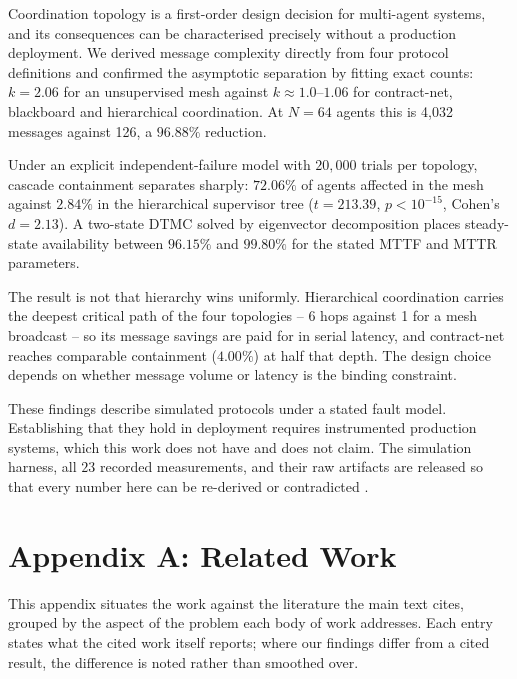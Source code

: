 \documentclass{article}
\begin{document}
Coordination topology is a first-order design decision for multi-agent systems, and its consequences can be characterised precisely without a production deployment. We derived message complexity directly from four protocol definitions and confirmed the asymptotic separation by fitting exact counts: $k = 2.06$ for an unsupervised mesh against $k \approx 1.0$--$1.06$ for contract-net, blackboard and hierarchical coordination. At $N = 64$ agents this is 4{,}032 messages against 126, a $96.88\%$ reduction.

Under an explicit independent-failure model with $20{,}000$ trials per topology, cascade containment separates sharply: $72.06\%$ of agents affected in the mesh against $2.84\%$ in the hierarchical supervisor tree ($t = 213.39$, $p < 10^{-15}$, Cohen's $d = 2.13$). A two-state DTMC solved by eigenvector decomposition places steady-state availability between $96.15\%$ and $99.80\%$ for the stated MTTF and MTTR parameters.

The result is not that hierarchy wins uniformly. Hierarchical coordination carries the deepest critical path of the four topologies -- 6 hops against 1 for a mesh broadcast -- so its message savings are paid for in serial latency, and contract-net reaches comparable containment ($4.00\%$) at half that depth. The design choice depends on whether message volume or latency is the binding constraint.

These findings describe simulated protocols under a stated fault model. Establishing that they hold in deployment requires instrumented production systems, which this work does not have and does not claim. The simulation harness, all $23$ recorded measurements, and their raw artifacts are released so that every number here can be re-derived or contradicted \cite{arxiv_2406_00584,crossref_10_1201_9788743808145_14,crossref_10_1108_jeim_12_2025_1269}.





\section{Appendix A: Related Work}


This appendix situates the work against the literature the main text cites, grouped by the aspect of the problem each body of work addresses. Each entry states what the cited work itself reports; where our findings differ from a cited result, the difference is noted rather than smoothed over.
\end{document}
